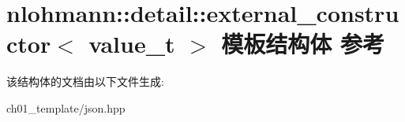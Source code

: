 \hypertarget{structnlohmann_1_1detail_1_1external__constructor}{}\section{nlohmann\+::detail\+::external\+\_\+constructor$<$ value\+\_\+t $>$ 模板结构体 参考}
\label{structnlohmann_1_1detail_1_1external__constructor}


该结构体的文档由以下文件生成\+:\begin{DoxyCompactItemize}
\item 
ch01\+\_\+template/json.\+hpp\end{DoxyCompactItemize}
